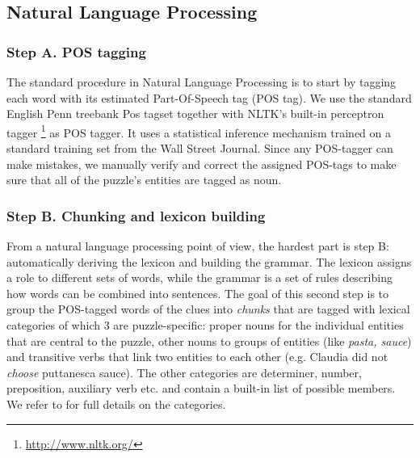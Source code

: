 \subsection{Natural Language Processing}\label{sec:pipeline:nlp}

\subsubsection*{Step A. POS tagging} The standard procedure in Natural Language Processing is to start by tagging each word with its estimated Part-Of-Speech tag (POS tag).
We use the standard English Penn treebank Pos tagset \cite{marcus1993building} together with NLTK's built-in perceptron tagger \footnote{\url{http://www.nltk.org/}} as POS tagger. 
It uses a statistical inference mechanism trained on a standard training set from the Wall Street Journal. 
Since any POS-tagger can make mistakes, we manually verify and correct the assigned POS-tags to make sure that all of the puzzle’s entities are tagged as noun.
	

\subsubsection*{Step B. Chunking and lexicon building} From a natural language processing point of view, the hardest part is step B: automatically deriving the lexicon and building the grammar.
The lexicon assigns a role to different sets of words, while the grammar is a set of rules describing how words can be combined into sentences. 
The goal of this second step is to group the POS-tagged words of the clues into \textit{chunks} that are tagged with lexical categories of which 3 are puzzle-specific: proper nouns for the individual entities that are central to the puzzle, other nouns to groups of entities (like \textit{pasta, sauce}) and transitive verbs that link two entities to each other (e.g. Claudia did not \textit{choose} puttanesca sauce). 
The other categories are determiner, number, preposition, auxiliary verb etc.  and contain a built-in list of possible members.  We refer to \cite{msc/Claes17} for full details on the categories.

